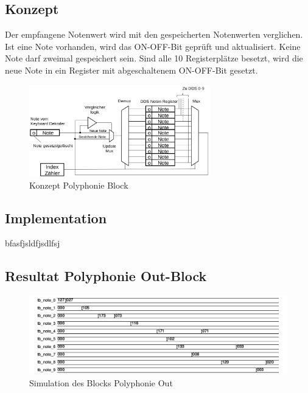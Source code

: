 \subsection{Konzept}\label{konzept_plyphonie}
Der empfangene Notenwert wird mit den gespeicherten Notenwerten verglichen. Ist eine Note vorhanden, wird das ON-OFF-Bit geprüft und aktualisiert. Keine Note darf zweimal gespeichert sein. Sind alle 10 Registerplätze besetzt, wird die neue Note in ein Register mit abgeschaltenem ON-OFF-Bit gesetzt.\\
\begin{figure}[H]
	\centering
	\includegraphics[width=0.7\textwidth]{images/midi_interface/Konzept_Hans_polyphonie.png}
	\caption{Konzept Polyphonie Block \cite{konzept_poly} }
	\label{fig.polyphnie_konzept}
\end{figure}

\subsection{Implementation}


bfasfjsldfjsdlfsj


\subsection{Resultat Polyphonie Out-Block}

\begin{figure}[H]
	\centering
	\includegraphics[width=1\textwidth]{images/midi_interface/tb_polyphonie.png}
	\caption{Simulation des Blocks Polyphonie Out }
	\label{fig.polyphnie_simulation}
\end{figure}